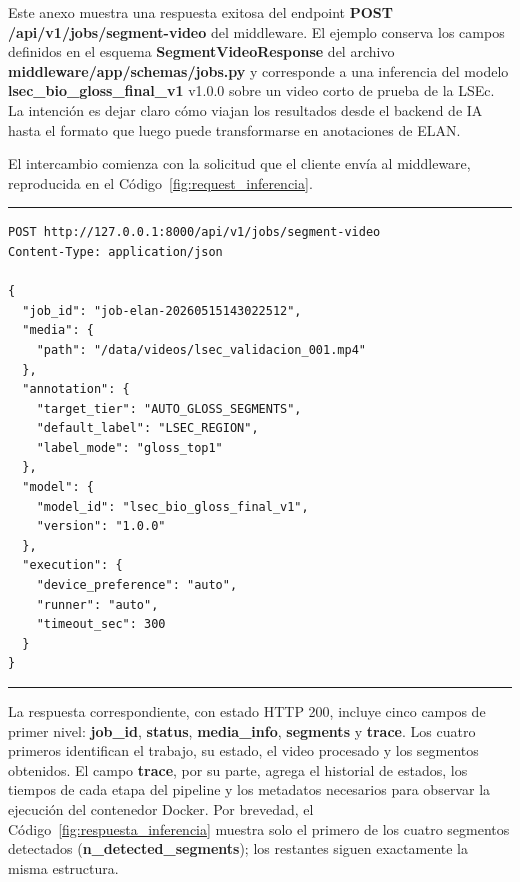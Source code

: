 \renewcommand{\thetable}{B.\arabic{table}}
\setcounter{table}{0}
\renewcommand{\thecodigo}{B.\arabic{codigo}}
\setcounter{codigo}{0}
\renewcommand{\thefigure}{B.\arabic{figure}}
\setcounter{figure}{0}

Este anexo muestra una respuesta exitosa del endpoint \textbf{POST /api/v1/jobs/segment-video} del middleware. El ejemplo conserva los campos definidos en el esquema \textbf{SegmentVideoResponse} del archivo \textbf{middleware/app/schemas/jobs.py} y corresponde a una inferencia del modelo \textbf{lsec\_bio\_gloss\_final\_v1} v1.0.0 sobre un video corto de prueba de la LSEc. La intención es dejar claro cómo viajan los resultados desde el backend de IA hasta el formato que luego puede transformarse en anotaciones de ELAN.

El intercambio comienza con la solicitud que el cliente envía al middleware, reproducida en el Código~\ref{fig:request_inferencia}.

\begin{center}
\begin{minipage}{0.96\textwidth}
\hrule
\vspace{0.06cm}
\scriptsize
\begin{Verbatim}[baselinestretch=0.68]
POST http://127.0.0.1:8000/api/v1/jobs/segment-video
Content-Type: application/json

{
  "job_id": "job-elan-20260515143022512",
  "media": {
    "path": "/data/videos/lsec_validacion_001.mp4"
  },
  "annotation": {
    "target_tier": "AUTO_GLOSS_SEGMENTS",
    "default_label": "LSEC_REGION",
    "label_mode": "gloss_top1"
  },
  "model": {
    "model_id": "lsec_bio_gloss_final_v1",
    "version": "1.0.0"
  },
  "execution": {
    "device_preference": "auto",
    "runner": "auto",
    "timeout_sec": 300
  }
}
\end{Verbatim}
\vspace{0.03cm}
\hrule

\label{fig:request_inferencia}
\end{minipage}
\end{center}

La respuesta correspondiente, con estado HTTP 200, incluye cinco campos de primer nivel: \textbf{job\_id}, \textbf{status}, \textbf{media\_info}, \textbf{segments} y \textbf{trace}. Los cuatro primeros identifican el trabajo, su estado, el video procesado y los segmentos obtenidos. El campo \textbf{trace}, por su parte, agrega el historial de estados, los tiempos de cada etapa del pipeline y los metadatos necesarios para observar la ejecución del contenedor Docker. Por brevedad, el Código~\ref{fig:respuesta_inferencia} muestra solo el primero de los cuatro segmentos detectados (\textbf{n\_detected\_segments}); los restantes siguen exactamente la misma estructura.

